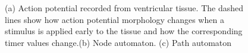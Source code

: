 \begin{figure}[!t]
	\centering
	\vspace{-10pt}
	\label{fig:h_automatas}
	\vspace{-8pt}
	\caption{\small (a) Action potential recorded from ventricular tissue. The dashed lines show how action potential morphology changes when a stimulus is applied early to the tissue and how the corresponding timer values change.(b) Node automaton. (c) Path automaton}
	\vspace{-10pt}
\end{figure} 

